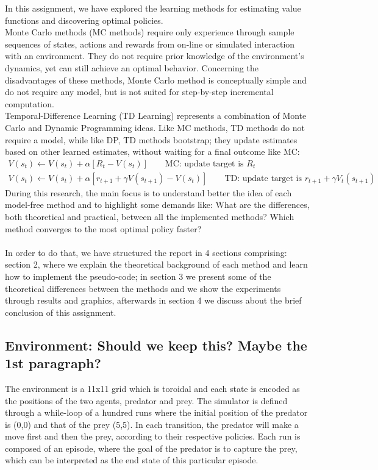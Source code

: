 \documentclass[paper=a4, fontsize=11pt]{scrartcl}
\numberwithin{equation}{section}		%
\numberwithin{figure}{section}			%
\numberwithin{table}{section}				%
\begin{document}
In this assignment, we have explored the learning methods for estimating value functions and discovering  optimal policies.\\ 
Monte Carlo methods (MC methods) require only experience through sample sequences of states, actions and rewards from on-line or simulated interaction with an environment. They do not require prior knowledge of the environment's dynamics, yet can still achieve an optimal behavior. Concerning the disadvantages of these methods, Monte Carlo method is conceptually simple and do not require any model, but is not suited for step-by-step incremental  computation.\\
Temporal-Difference Learning (TD Learning) represents a combination of Monte Carlo and Dynamic Programming ideas. Like MC methods, TD methods do not require a model, while like DP, TD methods bootstrap; they update estimates based on other learned estimates, without waiting for a final outcome like MC:
\begin{align}
V(s_t) \leftarrow V(s_t) + \alpha [R_t-V(s_t)] \qquad \text{MC: update target is $R_t$} \\
V(s_t) \leftarrow V(s_t) + \alpha[r_{t+1}+\gamma V(s_{t+1})-V(s_t)] \qquad \text{TD: update target is $r_{t+1}+\gamma V_t(s_{t+1})$}
\end{align}
During this research, the main focus is to understand better the idea of each model-free method and to highlight some demands like: What are the differences, both theoretical and practical, between all the implemented methods? Which method converges to the most optimal policy faster?\\ \\


In order to do that, we have structured the report in 4 sections comprising: section 2, where we explain the theoretical background of each method and learn how to implement the pseudo-code; in section 3 we present  some of the theoretical differences between the methods and we show the experiments through results and graphics, afterwards in section 4 we discuss about the brief conclusion of this assignment.

\subsection{Environment: Should we keep this? Maybe the 1st paragraph?}
\label{environment}
The environment is a 11x11 grid which is toroidal and each state is encoded as the positions of the two agents, predator and prey.
The simulator is defined through a while-loop of a hundred runs where the initial position of the predator is (0,0) and that of the prey (5,5). In each transition, the predator will make a move first and then the prey, according to their respective policies. Each run is composed of an episode, where the goal of the predator is to capture the prey, which can be interpreted as the end state of this particular episode. 
\end{document}
